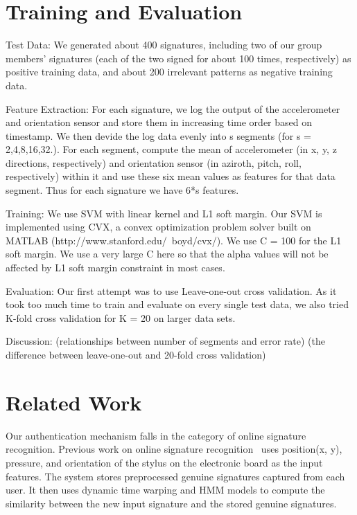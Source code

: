 \documentclass[12pt]{article}
\begin{document}
\section{Training and Evaluation}

Test Data:
We generated about 400 signatures, including two of our group members' signatures (each of the two signed for about 100 times, respectively) as positive training data, and about 200 irrelevant patterns as negative training data.

Feature Extraction:
For each signature, we log the output of the accelerometer and orientation sensor and store them in increasing time order based on timestamp. We then devide the log data evenly into s segments (for s = 2,4,8,16,32.). For each segment, compute the mean of accelerometer (in x, y, z directions, respectively) and orientation sensor (in aziroth, pitch, roll, respectively) within it and use these six mean values as features for that data segment. Thus for each signature we have 6*s features.

Training:
We use SVM with linear kernel and L1 soft margin. Our SVM is implemented using CVX, a convex optimization problem solver built on MATLAB (http://www.stanford.edu/~boyd/cvx/). We use C = 100 for the L1 soft margin. We use a very large C here so that the alpha values will not be affected by L1 soft margin constraint in most cases.

Evaluation:
Our first attempt was to use Leave-one-out cross validation. As it took too much time to train and evaluate on every single test data, we also tried K-fold cross validation for K = 20 on larger data sets.

Discussion:
(relationships between number of segments and error rate)
(the difference between leave-one-out and 20-fold cross validation)

\section{Related Work}

Our authentication mechanism falls in the category of online signature recognition. Previous work on online signature recognition~\cite{zanuy:2006} uses position(x, y), pressure, and orientation of the stylus on the electronic board as the input features. The system stores preprocessed genuine signatures captured from each user. It then uses dynamic time warping and HMM models to compute the similarity between the new input signature and the stored genuine signatures.
\end{document}
